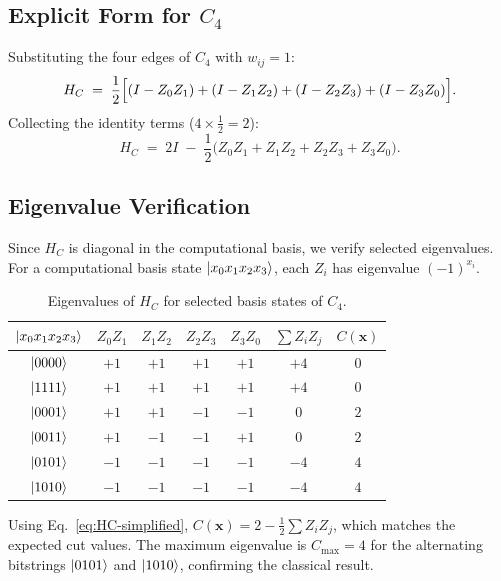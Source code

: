 \documentclass[11pt,a4paper]{article}
\begin{document}
\subsection{Explicit Form for $C_4$}

Substituting the four edges of $C_4$ with $w_{ij}=1$:
\begin{equation}\label{eq:HC-c4}
  H_C \;=\; \frac{1}{2}\Bigl[
    (I - Z_0 Z_1) + (I - Z_1 Z_2) + (I - Z_2 Z_3) + (I - Z_3 Z_0)
  \Bigr].
\end{equation}
Collecting the identity terms ($4 \times \tfrac{1}{2} = 2$):
\begin{equation}\label{eq:HC-simplified}
  \boxed{H_C \;=\; 2I \;-\; \frac{1}{2}\bigl(
    Z_0 Z_1 + Z_1 Z_2 + Z_2 Z_3 + Z_3 Z_0
  \bigr).}
\end{equation}

\subsection{Eigenvalue Verification}

Since $H_C$ is diagonal in the computational basis, we verify selected
eigenvalues.  For a computational basis state $\ket{x_0 x_1 x_2 x_3}$, each
$Z_i$ has eigenvalue $(-1)^{x_i}$.

\begin{table}[H]
\centering
\caption{Eigenvalues of $H_C$ for selected basis states of $C_4$.}
\label{tab:eigenvalues}
\begin{tabular}{ccccccc}
\toprule
$\ket{x_0 x_1 x_2 x_3}$ & $Z_0Z_1$ & $Z_1Z_2$ & $Z_2Z_3$ & $Z_3Z_0$
  & $\sum Z_iZ_j$ & $C(\mathbf{x})$ \\
\midrule
$\ket{0000}$ & $+1$ & $+1$ & $+1$ & $+1$ & $+4$ & $0$ \\
$\ket{1111}$ & $+1$ & $+1$ & $+1$ & $+1$ & $+4$ & $0$ \\
$\ket{0001}$ & $+1$ & $+1$ & $-1$ & $-1$ & $0$ & $2$ \\
$\ket{0011}$ & $+1$ & $-1$ & $-1$ & $+1$ & $0$ & $2$ \\
$\ket{0101}$ & $-1$ & $-1$ & $-1$ & $-1$ & $-4$ & $4$ \\
$\ket{1010}$ & $-1$ & $-1$ & $-1$ & $-1$ & $-4$ & $4$ \\
\bottomrule
\end{tabular}
\end{table}

Using Eq.~\eqref{eq:HC-simplified}, $C(\mathbf{x}) = 2 - \frac{1}{2}\sum
Z_iZ_j$, which matches the expected cut values.  The maximum eigenvalue is
$C_{\max}=4$ for the alternating bitstrings $\ket{0101}$ and $\ket{1010}$,
confirming the classical result.
\end{document}

